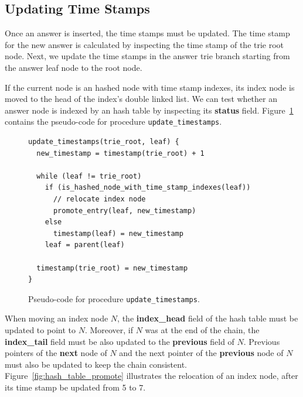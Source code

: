 \subsection{Updating Time Stamps}

Once an answer is inserted, the time stamps must be updated.
The time stamp for the new answer is calculated by inspecting the time stamp of the trie root node.
Next, we update the time stamps in the answer trie branch starting from the answer leaf node to the
root node.

If the current node is an hashed node with time stamp indexes,
its index node is moved to the head of
the index's double linked list. We can test whether an answer node is indexed by
an hash table by inspecting its \textbf{status} field.
Figure~\ref{fig:update_timestamps} contains the pseudo-code for procedure \texttt{update\_timestamps}.

\begin{figure}[ht]
\begin{Verbatim}
update_timestamps(trie_root, leaf) {
  new_timestamp = timestamp(trie_root) + 1
  
  while (leaf != trie_root)
    if (is_hashed_node_with_time_stamp_indexes(leaf))
      // relocate index node
      promote_entry(leaf, new_timestamp)
    else
      timestamp(leaf) = new_timestamp
    leaf = parent(leaf)
      
  timestamp(trie_root) = new_timestamp
}
\end{Verbatim}
\caption{Pseudo-code for procedure \texttt{update\_timestamps}.}
\label{fig:update_timestamps}
\end{figure}

When moving an index node $N$, the \textbf{index\_head} field of the hash table must be updated
to point to $N$. Moreover, if $N$ was at the end of the chain,
the \textbf{index\_tail} field must be also updated to the \textbf{previous} field of $N$.
Previous pointers of the \textbf{next} node of $N$ and the next pointer of
the \textbf{previous} node of $N$ must
also be updated to keep the chain consistent.
Figure~\ref{fig:hash_table_promote} illustrates the relocation of an index node, after
its time stamp be updated from 5 to 7.

